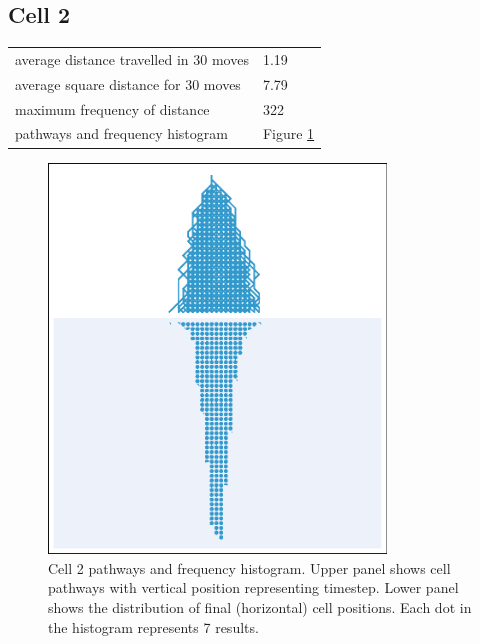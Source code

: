 \documentclass[11pt,a4paper]{article}
\newcommand \bt{\begin{longtable}{p{0.65\textwidth}p{0.25\textwidth}}}
\newcommand \et{\end{longtable}}
\begin{document}
\subsection*{Cell 2}
\bt
average distance travelled in 30 moves &  1.19\\
average square distance for 30 moves & 7.79\\
maximum frequency of distance & 322\\
pathways and frequency histogram & Figure \ref{fig2}
\et
\begin{figure}[htbp]
\begin{center}
\includegraphics[width=0.8\textwidth]{CA30_R40L40_2.eps}
\caption{Cell 2 pathways and frequency histogram. Upper panel shows cell pathways with vertical position representing timestep. 
Lower panel shows the distribution of final (horizontal) cell positions. Each dot in the histogram represents 7 results.}
\label{fig2}
\end{center}
\end{figure}
\end{document}
